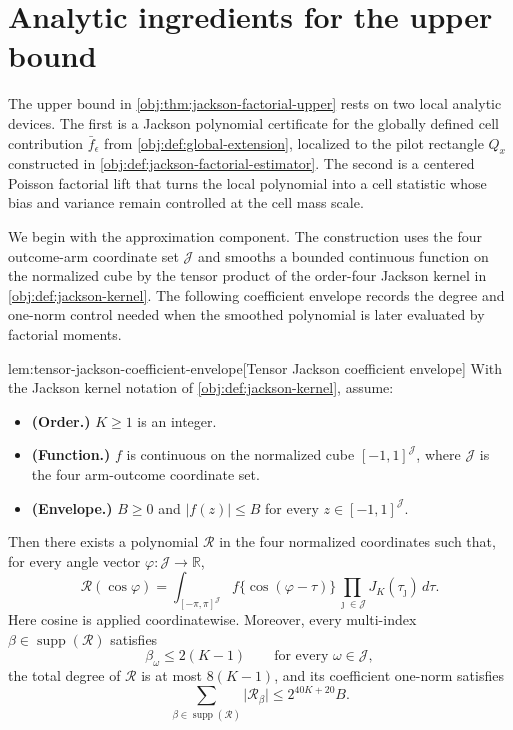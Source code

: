 \section{Analytic ingredients for the upper bound}

The upper bound in \cref{obj:thm:jackson-factorial-upper} rests on two local analytic devices. The first is a Jackson polynomial certificate for the globally defined cell contribution \(\bar f_\epsilon\) from \cref{obj:def:global-extension}, localized to the pilot rectangle \(Q_x\) constructed in \cref{obj:def:jackson-factorial-estimator}. The second is a centered Poisson factorial lift that turns the local polynomial into a cell statistic whose bias and variance remain controlled at the cell mass scale.

We begin with the approximation component. The construction uses the four outcome-arm coordinate set \(\mathcal J\) and smooths a bounded continuous function on the normalized cube by the tensor product of the order-four Jackson kernel in \cref{obj:def:jackson-kernel}. The following coefficient envelope records the degree and one-norm control needed when the smoothed polynomial is later evaluated by factorial moments.

\begin{lemmav}{lem:tensor-jackson-coefficient-envelope}[Tensor Jackson coefficient envelope]
With the Jackson kernel notation of \cref{obj:def:jackson-kernel}, assume:
\begin{itemize}
\item \textbf{(Order.)} \(K\ge 1\) is an integer.
\item \textbf{(Function.)} \(f\) is continuous on the normalized cube \([-1,1]^{\mathcal J}\), where \(\mathcal J\) is the four arm-outcome coordinate set.
\item \textbf{(Envelope.)} \(B\ge 0\) and \(\lvert f(z)\rvert\le B\) for every \(z\in[-1,1]^{\mathcal J}\).
\end{itemize}
Then there exists a polynomial \(\mathcal R\) in the four normalized coordinates such that, for every angle vector \(\varphi:\mathcal J\to\mathbb R\),
\[
\mathcal R(\cos\varphi)
=
\int_{[-\pi,\pi]^{\mathcal J}}
f\{\cos(\varphi-\tau)\}
\prod_{\jmath\in\mathcal J}J_K(\tau_\jmath)\,d\tau .
\]
Here cosine is applied coordinatewise. Moreover, every multi-index \(\beta\in\operatorname{supp}(\mathcal R)\) satisfies
\[
\beta_\omega\le 2(K-1)
\qquad\text{for every }\omega\in\mathcal J,
\]
the total degree of \(\mathcal R\) is at most \(8(K-1)\), and its coefficient one-norm satisfies
\[
\sum_{\beta\in\operatorname{supp}(\mathcal R)}
\lvert \mathcal R_\beta\rvert
\le 2^{40K+20}B .
\]
\end{lemmav}

